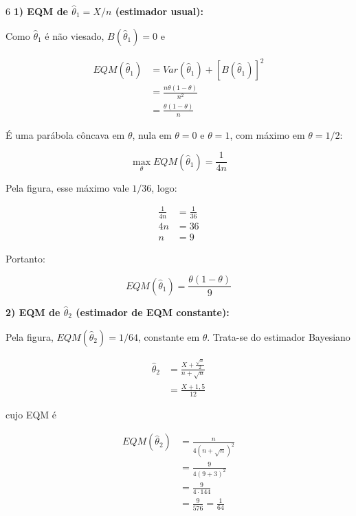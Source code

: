 \documentclass[8pt, a4paper, landscape]{extarticle}
\begin{document}
\begin{multicols}{6}
\textbf{1) EQM de $\hat{\theta}_1 = X/n$ (estimador usual):}

Como $\hat{\theta}_1$ é não viesado, $B(\hat{\theta}_1) = 0$ e

\begin{equation*}
\begin{split}
EQM(\hat{\theta}_1) &= Var(\hat{\theta}_1) + [B(\hat{\theta}_1)]^2 \\
&= \frac{n\theta(1-\theta)}{n^2} \\
&= \frac{\theta(1-\theta)}{n}
\end{split}
\end{equation*}

É uma parábola côncava em $\theta$, nula em $\theta = 0$ e $\theta = 1$, com máximo em $\theta = 1/2$:

\begin{equation*}
\max_\theta EQM(\hat{\theta}_1) = \frac{1}{4n}
\end{equation*}

Pela figura, esse máximo vale $1/36$, logo:

\begin{equation*}
\begin{split}
\frac{1}{4n} &= \frac{1}{36} \\
4n &= 36 \\
n &= 9
\end{split}
\end{equation*}

Portanto:

\begin{equation*}
EQM(\hat{\theta}_1) = \frac{\theta(1-\theta)}{9}
\end{equation*}

\vspace{0.2cm}

\textbf{2) EQM de $\hat{\theta}_2$ (estimador de EQM constante):}

Pela figura, $EQM(\hat{\theta}_2) = 1/64$, constante em $\theta$. Trata-se do estimador Bayesiano

\begin{equation*}
\begin{split}
\hat{\theta}_2 &= \frac{X + \frac{\sqrt{n}}{2}}{n + \sqrt{n}} \\
&= \frac{X + 1,5}{12}
\end{split}
\end{equation*}

cujo EQM é

\begin{equation*}
\begin{split}
EQM(\hat{\theta}_2) &= \frac{n}{4(n+\sqrt{n})^2} \\
&= \frac{9}{4(9+3)^2} \\
&= \frac{9}{4 \cdot 144} \\
&= \frac{9}{576} = \frac{1}{64}
\end{split}
\end{equation*}


\end{multicols}
\end{document}
